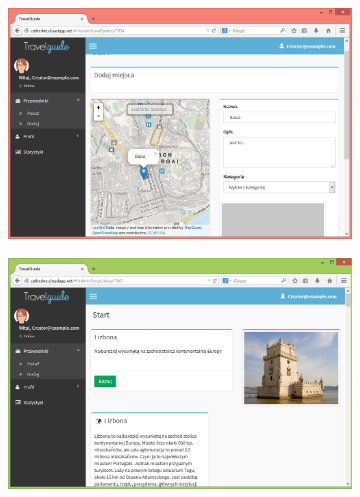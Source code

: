 \documentclass{book}
\begin{document}
		\begin{figure}[H]
			\ContinuedFloat
			
			\begin{subfigure}{1\textwidth}
				\includegraphics[width=\textwidth]{screenshots/web/5dodawanie3.png}						
				\caption{\label{subfig:web_add3}}
			\end{subfigure}
			\hfill
			\begin{subfigure}{1\textwidth}
				\includegraphics[width=\textwidth]{screenshots/web/6widok.png}
				\caption{\label{subfig:web_view}}	
			\end{subfigure}
			
		\end{figure}
\end{document}
